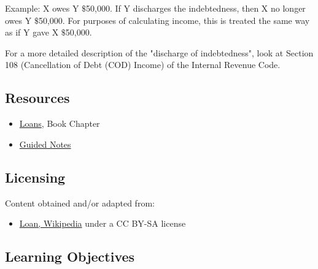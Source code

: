 Example: X owes Y $\text{\$}$50,000. If Y discharges the indebtedness, then X no longer
owes Y $\text{\$}$50,000. For purposes of calculating income, this is treated the same way
as if Y gave X $\text{\$}$50,000.



For a more detailed description of the "discharge of indebtedness", look at Section 108
(Cancellation of Debt (COD) Income) of the Internal Revenue Code.




\subsection{Resources}
\label{sss:reso-55b5}




\begin{itemize}
    \item \href{https://mathresearch.utsa.edu/wikiFiles/MAT1053/Loans/MAT1053_M8.1Loans.pdf}{Loans}, Book Chapter
    \item \href{https://mathresearch.utsa.edu/wikiFiles/MAT1053/Loans/MAT1053_M8.1LoansGN.pdf}{Guided Notes}
\end{itemize}


\subsection{Licensing}
\label{sss:lice-7352}




Content obtained and/or adapted from:



\begin{itemize}
    \item \href{https://en.wikipedia.org/wiki/Loan}{Loan, Wikipedia} under a CC BY-SA license
\end{itemize}


\subsection{Learning Objectives}
\label{ssec:lear-fe6e}


